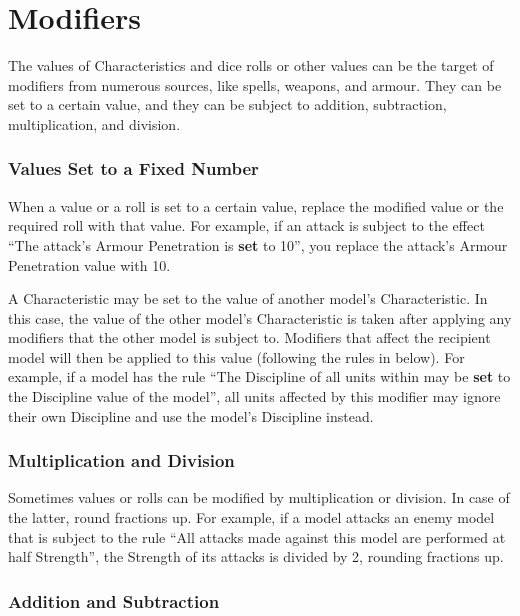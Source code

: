 
\part{Modifiers}
\label{modifiers}

The values of Characteristics and dice rolls or other values can be the target of modifiers from numerous sources, like spells, weapons, and armour. They can be set to a certain value, and they can be subject to addition, subtraction, multiplication, and division.

\RBbmc

\section{Values Set to a Fixed Number}
\label{values_set_to_a_fixed_number}

When a value or a roll is set to a certain value, replace the modified value or the required roll with that value. For example, if an attack is subject to the effect \enquote{The attack's Armour Penetration is \textbf{set} to 10}, you replace the attack's Armour Penetration value with 10.

A Characteristic may be set to the value of another model's Characteristic. In this case, the value of the other model's Characteristic is taken after applying any modifiers that the other model is subject to. Modifiers that affect the recipient model will then be applied to this value (following the rules in  below). For example, if a model has the rule \enquote{The Discipline of all units within  may be \textbf{set} to the Discipline value of the model}, all units affected by this modifier may ignore their own Discipline and use the model's Discipline instead.

\section{Multiplication and Division}
\label{multiplication_and_division}

Sometimes values or rolls can be modified by multiplication or division. In case of the latter, round fractions up. For example, if a model attacks an enemy model that is subject to the rule \enquote{All attacks made against this model are performed at half Strength}, the Strength of its attacks is divided by 2, rounding fractions up.

\section{Addition and Subtraction}
\label{addition_and_subtraction}

